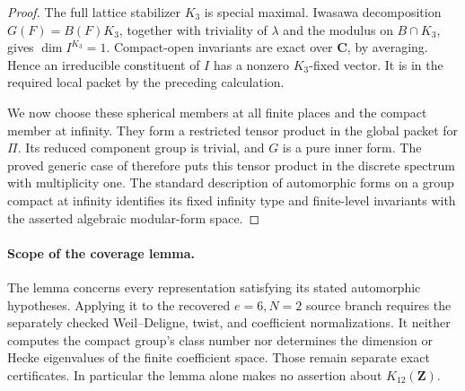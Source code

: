\begin{proof}
The full lattice stabilizer $K_3$ is special maximal. Iwasawa decomposition
$G(F)=B(F)K_3$, together with triviality of $\lambda$ and the modulus on
$B\cap K_3$, gives $\dim I^{K_3}=1$. Compact-open invariants are exact
over $\mathbf C$, by averaging. Hence an irreducible constituent of $I$
has a nonzero $K_3$-fixed vector. It is in the required local packet by the
preceding calculation.

We now choose these spherical members at all finite places and the compact
member at infinity. They form a restricted tensor product in the global
packet for $\Pi$. Its reduced component group is trivial, and $G$ is a
pure inner form. The proved generic case of
\cite[Theorem~5.0.5]{K17KMSW2014} therefore puts this tensor product in
the discrete spectrum with multiplicity one. The standard description of
automorphic forms on a group compact at infinity identifies its fixed
infinity type and finite-level invariants with the asserted algebraic
modular-form space.
\end{proof}

\paragraph{Scope of the coverage lemma.}
The lemma concerns every representation satisfying its stated automorphic
hypotheses. Applying it to the recovered $e=6,N=2$ source branch requires
the separately checked Weil--Deligne, twist, and coefficient normalizations.
It neither computes the compact group's class number nor determines the
dimension or Hecke eigenvalues of the finite coefficient space. Those
remain separate exact certificates. In particular the lemma alone makes
no assertion about $K_{12}(\mathbf Z)$.
